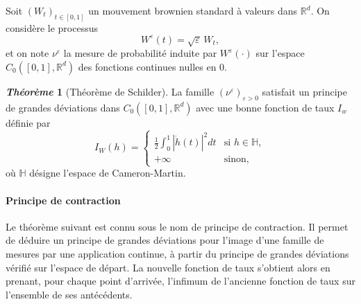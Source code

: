 \documentclass[12pt,a4paper,twoside]{book}%
\theoremstyle{definition}
\newtheorem{thm}[dfn]{\textit{Théorème}}
\numberwithin{equation}{section}
\begin{document}
Soit $(W_t)_{t\in[0,1]}$ un mouvement brownien standard à valeurs dans $\mathbb{R}^d$. On considère le processus
\[
W^\varepsilon(t)=\sqrt{\varepsilon}\, W_t,
\]
et on note $\nu^\varepsilon$ la mesure de probabilité induite par $W^\varepsilon(\cdot)$ sur l’espace $C_0([0,1],\mathbb{R}^d)$ des fonctions continues nulles en $0$.

\begin{thm}[Théorème de Schilder]
	La famille $(\nu^\varepsilon)_{\varepsilon>0}$ satisfait un principe de grandes déviations dans $C_0([0,1],\mathbb{R}^d)$ avec une bonne fonction de taux $I_w$ définie par
	\[
	I_W(h) =
	\begin{cases}
		\displaystyle \frac{1}{2} \int_{0}^{1} |\dot{h}(t)|^2 dt & \text{si } h \in \mathbb{H}, \\
		+\infty & \text{sinon},
	\end{cases}
	\]
	où $\mathbb{H}$ désigne l’espace de Cameron-Martin.
\end{thm}
\paragraph{Principe de contraction}
Le théorème suivant est connu sous le nom de principe de contraction. Il permet de déduire un principe de grandes déviations pour l’image d’une famille de mesures par une application continue, à partir du principe de grandes déviations vérifié sur l’espace de départ. La nouvelle fonction de taux s’obtient alors en prenant, pour chaque point d’arrivée, l’infimum de l’ancienne fonction de taux sur l’ensemble de ses antécédents.
\end{document}
